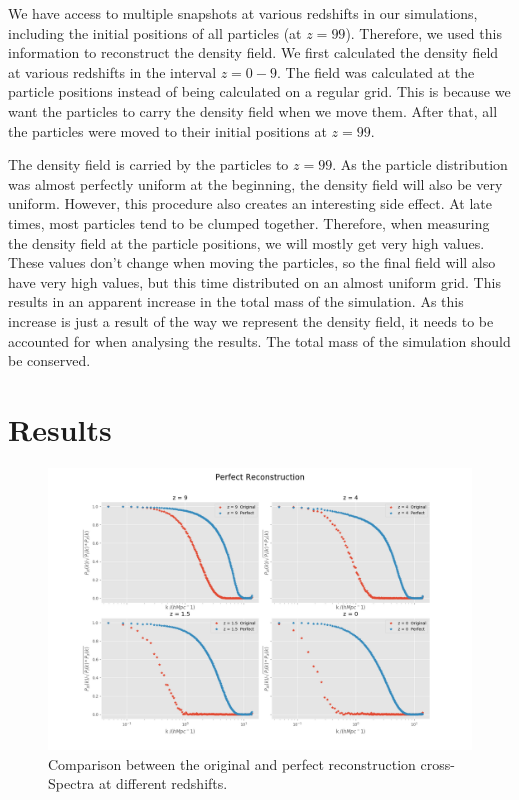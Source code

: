 
\indent We have access to multiple snapshots at various redshifts in our simulations, including the initial positions of all particles (at $z = 99$). Therefore, we used this information to reconstruct the density field. We first calculated the density field at various redshifts in the interval $z = 0 - 9$. The field was calculated at the particle positions instead of being calculated on a regular grid. This is because we want the particles to carry the density field when we move them. After that, all the particles were moved to their initial positions at $z = 99$.

The density field is carried by the particles to $z = 99$. As the particle distribution was almost perfectly uniform at the beginning, the density field will also be very uniform. However, this procedure also creates an interesting side effect. At late times, most particles tend to be clumped together. Therefore, when measuring the density field at the particle positions, we will mostly get very high values. These values don't change when moving the particles, so the final field will also have very high values, but this time distributed on an almost uniform grid. This results in an apparent increase in the total mass of the simulation. As this increase is just a result of the way we represent the density field, it needs to be accounted for when analysing the results. The total mass of the simulation should be conserved. 

\section{Results}


\begin{figure}
    \centering
    \includegraphics[width=1\columnwidth]{images/crossSpectra/Spec_1_perf.png}%
    
    \caption{
    Comparison between the original and perfect reconstruction cross-Spectra at different redshifts. 
    }
    
    \label{fig:4}
\end{figure}

